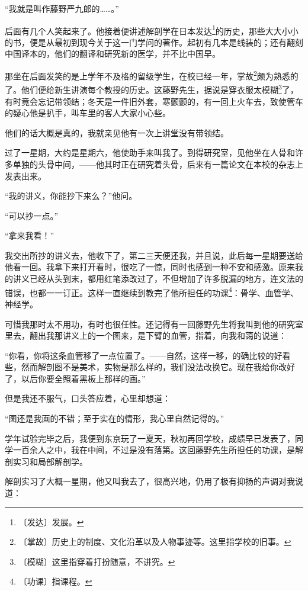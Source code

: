 \documentclass[12pt,UTF-8,openany]{ctexbook}
\begin{document}
\begin{large}
    “我就是叫作藤野严九郎的……。”
    
    后面有几个人笑起来了。他接着便讲述解剖学在日本发达\footnote{〔发达〕发展。}的历史，那些大大小小的书，便是从最初到现今关于这一门学问的著作。起初有几本是线装的；还有翻刻中国译本的，他们的翻译和研究新的医学，并不比中国早。
    
    那坐在后面发笑的是上学年不及格的留级学生，在校已经一年，掌故\footnote{〔掌故〕历史上的制度、文化沿革以及人物事迹等。这里指学校的旧事。}颇为熟悉的了。他们便给新生讲演每个教授的历史。这藤野先生，据说是穿衣服太模糊\footnote{〔模糊〕这里指穿着打扮随意，不讲究。}了，有时竟会忘记带领结；冬天是一件旧外套，寒颤颤的，有一回上火车去，致使管车的疑心他是扒手，叫车里的客人大家小心些。
    
    他们的话大概是真的，我就亲见他有一次上讲堂没有带领结。
    
    过了一星期，大约是星期六，他使助手来叫我了。到得研究室，见他坐在人骨和许多单独的头骨中间，——他其时正在研究着头骨，后来有一篇论文在本校的杂志上发表出来。
    
    “我的讲义，你能抄下来么？”他问。
    
    “可以抄一点。”
    
    “拿来我看！”
    
    我交出所抄的讲义去，他收下了，第二三天便还我，并且说，此后每一星期要送给他看一回。我拿下来打开看时，很吃了一惊，同时也感到一种不安和感激。原来我的讲义已经从头到末，都用红笔添改过了，不但增加了许多脱漏的地方，连文法的错误，也都一一订正。这样一直继续到教完了他所担任的功课\footnote{〔功课〕指课程。}：骨学、血管学、神经学。
    
    可惜我那时太不用功，有时也很任性。还记得有一回藤野先生将我叫到他的研究室里去，翻出我那讲义上的一个图来，是下臂的血管，指着，向我和蔼的说道：
    
    “你看，你将这条血管移了一点位置了。——自然，这样一移，的确比较的好看些，然而解剖图不是美术，实物是那么样的，我们没法改换它。现在我给你改好了，以后你要全照着黑板上那样的画。”
    
    但是我还不服气，口头答应着，心里却想道：
    
    “图还是我画的不错；至于实在的情形，我心里自然记得的。”
    
    学年试验完毕之后，我便到东京玩了一夏天，秋初再回学校，成绩早已发表了，同学一百余人之中，我在中间，不过是没有落第。这回藤野先生所担任的功课，是解剖实习和局部解剖学。
    
    解剖实习了大概一星期，他又叫我去了，很高兴地，仍用了极有抑扬的声调对我说道：
    

\end{large}
\end{document}
